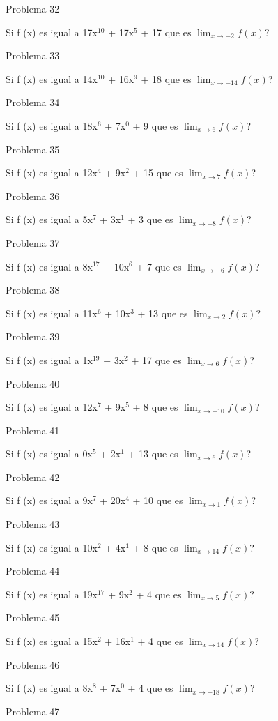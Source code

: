 \documentclass{article}
\begin{document}
Problema 32

Si f (x) es igual a 17x$^{10}$ +  17x${^5}$ + 17 que es $\lim_{x\to -2} f(x) $?

Problema 33

Si f (x) es igual a 14x$^{10}$ +  16x${^9}$ + 18 que es $\lim_{x\to -14} f(x) $?

Problema 34

Si f (x) es igual a 18x$^{6}$ +  7x${^0}$ + 9 que es $\lim_{x\to 6} f(x) $?

Problema 35

Si f (x) es igual a 12x$^{4}$ +  9x${^2}$ + 15 que es $\lim_{x\to 7} f(x) $?

Problema 36

Si f (x) es igual a 5x$^{7}$ +  3x${^1}$ + 3 que es $\lim_{x\to -8} f(x) $?

Problema 37

Si f (x) es igual a 8x$^{17}$ +  10x${^6}$ + 7 que es $\lim_{x\to -6} f(x) $?

Problema 38

Si f (x) es igual a 11x$^{6}$ +  10x${^3}$ + 13 que es $\lim_{x\to 2} f(x) $?

Problema 39

Si f (x) es igual a 1x$^{19}$ +  3x${^2}$ + 17 que es $\lim_{x\to 6} f(x) $?

Problema 40

Si f (x) es igual a 12x$^{7}$ +  9x${^5}$ + 8 que es $\lim_{x\to -10} f(x) $?

Problema 41

Si f (x) es igual a 0x$^{5}$ +  2x${^1}$ + 13 que es $\lim_{x\to 6} f(x) $?

Problema 42

Si f (x) es igual a 9x$^{7}$ +  20x${^4}$ + 10 que es $\lim_{x\to 1} f(x) $?

Problema 43

Si f (x) es igual a 10x$^{2}$ +  4x${^1}$ + 8 que es $\lim_{x\to 14} f(x) $?

Problema 44

Si f (x) es igual a 19x$^{17}$ +  9x${^2}$ + 4 que es $\lim_{x\to 5} f(x) $?

Problema 45

Si f (x) es igual a 15x$^{2}$ +  16x${^1}$ + 4 que es $\lim_{x\to 14} f(x) $?

Problema 46

Si f (x) es igual a 8x$^{8}$ +  7x${^0}$ + 4 que es $\lim_{x\to -18} f(x) $?

Problema 47
\end{document}
